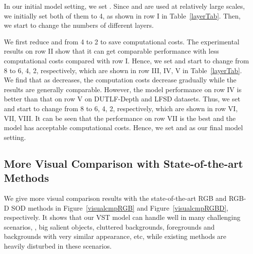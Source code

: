 \documentclass[10pt,twocolumn,letterpaper]{article}
\begin{document}
In our initial model setting, we set . Since  and  are used at relatively large scales, we initially set both of them to 4, as shown in row I in Table~\ref{layerTab}. Then, we start to change the numbers of different layers.


We first reduce  and  from 4 to 2 to save computational costs.
The experimental results on row II show that it can get comparable performance with less computational costs compared with row I.
Hence, we set  and start to change  from 8 to 6, 4, 2, respectively, which are shown in row III, IV, V in Table~\ref{layerTab}.
We find that as  decreases, the computation costs decrease gradually while the results are generally comparable.
However, the model performance on row IV is better than that on row V on DUTLF-Depth and LFSD datasets.
Thus, we set  and start to change  from 8 to 6, 4, 2, respectively, which are shown in row VI, VII, VIII.
It can be seen that the performance on row VII is the best and the model has acceptable computational costs.
Hence, we set  and  as our final model setting.



\subsection{More Visual Comparison with State-of-the-art Methods}
We give more visual comparison results with the state-of-the-art RGB and RGB-D SOD methods in Figure~\ref{visualcmpRGB} and Figure~\ref{visualcmpRGBD}, respectively. It shows that our VST model can handle well in many challenging scenarios, \ie, big salient objects, cluttered backgrounds, foregrounds and backgrounds with very similar appearance, etc, while existing methods are heavily disturbed in these scenarios.
\end{document}
